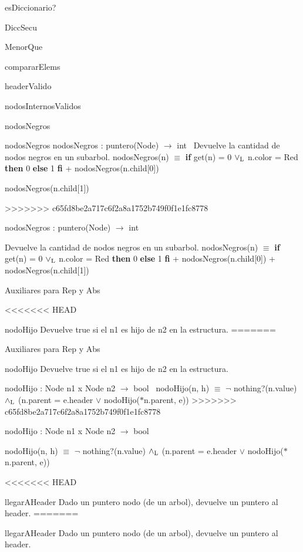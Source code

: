\begin{DoxyParagraph}{es\-Diccionario?}
\begin{DoxyParagraph}{\-Dicc\-Secu}
\begin{DoxyParagraph}{\-Menor\-Que}
\begin{DoxyParagraph}{comparar\-Elems}
\begin{DoxyParagraph}{header\-Valido}
\begin{DoxyParagraph}{nodos\-Internos\-Validos}
\begin{DoxyParagraph}{nodos\-Negros}
\begin{DoxyParagraph}{nodos\+Negros}
nodos\+Negros \+: puntero(\+Node) $\to$ int~\newline
Devuelve la cantidad de nodos negros en un subarbol. nodos\+Negros(n) $\equiv$ {\bfseries if} get(n) = 0 $\lor_{\rm L}$ n.\+color = Red {\bfseries then} 0 {\bfseries else} 1 {\bfseries fi} + nodos\+Negros(n.\+child\mbox{[}0\mbox{]})
\begin{DoxyItemize}
\item nodos\+Negros(n.\+child\mbox{[}1\mbox{]}) 
\end{DoxyItemize}
>>>>>>> c65fd8be2a717c6f2a8a1752b749f0f1e1fc8778
\end{DoxyParagraph}
nodos\-Negros \-: puntero(\-Node) $\to$ int\par
 \-Devuelve la cantidad de nodos negros en un subarbol. nodos\-Negros(n) $\equiv$ {\bfseries if} get(n) = 0 $\lor_{\rm L}$ n.\-color = \-Red {\bfseries then} 0 {\bfseries else} 1 {\bfseries fi} + nodos\-Negros(n.\-child\mbox{[}0\mbox{]}) + nodos\-Negros(n.\-child\mbox{[}1\mbox{]}) 

\-Auxiliares para \-Rep y \-Abs

<<<<<<< HEAD
\begin{DoxyParagraph}{nodo\-Hijo}
\-Devuelve true si el n1 es hijo de n2 en la estructura.
=======
\begin{DoxyVerb}Auxiliares para Rep y Abs
\end{DoxyVerb}


\begin{DoxyParagraph}{nodo\+Hijo}
Devuelve true si el n1 es hijo de n2 en la estructura.

nodo\+Hijo \+: Node n1 x Node n2 $\to$ bool~\newline
nodo\+Hijo(n, h) $\equiv$ $\lnot$ nothing?(n.\+value) $\land_{\rm L}$ (n.\+parent = e.\+header $\lor$ nodo\+Hijo($\ast$n.parent, e)) 
>>>>>>> c65fd8be2a717c6f2a8a1752b749f0f1e1fc8778
\end{DoxyParagraph}
nodo\-Hijo \-: \-Node n1 x \-Node n2 $\to$ bool\par
 nodo\-Hijo(n, h) $\equiv$ $\lnot$ nothing?(n.\-value) $\land_{\rm L}$ (n.\-parent = e.\-header $\lor$ nodo\-Hijo($\ast$n.parent, e)) 

<<<<<<< HEAD
\begin{DoxyParagraph}{llegar\-A\-Header}
\-Dado un puntero nodo (de un arbol), devuelve un puntero al header.
=======

\begin{DoxyParagraph}{llegar\+A\+Header}
Dado un puntero nodo (de un arbol), devuelve un puntero al header.


\end{DoxyParagraph}
\end{DoxyParagraph}
\end{DoxyParagraph}
\end{DoxyParagraph}
\end{DoxyParagraph}
\end{DoxyParagraph}
\end{DoxyParagraph}
\end{DoxyParagraph}
\end{DoxyParagraph}
\end{DoxyParagraph}
